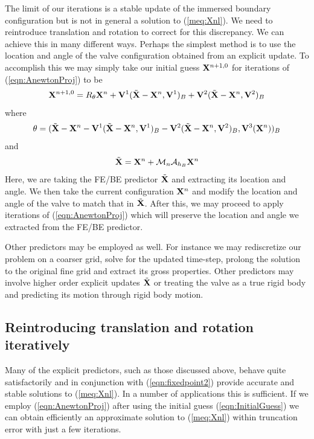 The limit of our iterations is a stable update of the immersed boundary configuration but is not in general a solution to (\ref{meq:Xnl}). We need to reintroduce translation and rotation to correct for this 
discrepancy. We can achieve this in many different ways. Perhaps the simplest method is  to use the location and angle of the valve configuration obtained from an explicit update. To accomplish this we may simply take our initial guess $\mathbf{X}^{n+1,0}$ for iterations of (\ref{eqn:AnewtonProj}) to be
\begin{equation}
\mathbf{X}^{n+1,0} = R_{\theta}\mathbf{X}^n + \mathbf{V}^1(\tilde{\mathbf{X}}-\mathbf{X}^n,\mathbf{V}^1)_B
+ \mathbf{V}^2(\tilde{\mathbf{X}}-\mathbf{X}^n,\mathbf{V}^2)_B
\label{eqn:InitialGuess}
\end{equation}
where
\begin{equation}
\theta = (\tilde{\mathbf{X}}-\mathbf{X}^n
-\mathbf{V}^1(\tilde{\mathbf{X}}-\mathbf{X}^n,\mathbf{V}^1)_B
-\mathbf{V}^2(\tilde{\mathbf{X}}-\mathbf{X}^n,\mathbf{V}^2)_B
,\mathbf{V}^3(\mathbf{X}^n))_B
\end{equation}
and
\begin{equation}
\tilde{\mathbf{X}} = \mathbf{X}^n + \mathcal{M}_n\mathcal{A}_{h_B}\mathbf{X}^n
\end{equation}
Here, we are taking the FE/BE predictor $\tilde{\mathbf{X}}$ and extracting its location and angle. We then take the current configuration $\mathbf{X}^n$ and modify the location and angle of the valve to match that in $\tilde{\mathbf{X}}$. After this, 
 we may proceed to apply iterations of (\ref{eqn:AnewtonProj}) which will preserve the location and angle we extracted from the FE/BE predictor.

Other predictors may be employed as well. 
For instance we may rediscretize our problem on a coarser grid, solve for the updated time-step, prolong the solution to the original fine grid and extract its gross properties. 
Other predictors may involve higher order explicit updates $\tilde{\mathbf{X}}$ or treating the valve as a true rigid body and predicting its motion through rigid body motion. 

\subsection{Reintroducing translation and rotation iteratively}
Many of the explicit predictors, such as those discussed above,  behave quite satisfactorily and in conjunction with  (\ref{eqn:fixedpoint2}) provide accurate and stable solutions to (\ref{meq:Xnl}). 
 In a number of applications this is sufficient. If we employ (\ref{eqn:AnewtonProj}) after using the initial guess (\ref{eqn:InitialGuess}) we can obtain efficiently an approximate  solution to (\ref{meq:Xnl}) within truncation error with just a few iterations.

